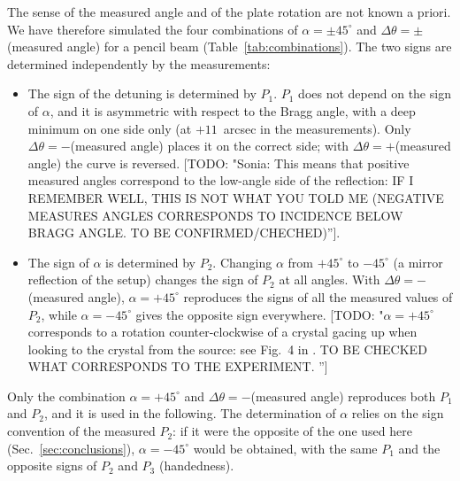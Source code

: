\documentclass{iucr}
\newcommand{\todo}[1]{{\color{red}[TODO: "#1'']}}
\begin{document}
The sense of the measured angle and of the plate rotation are not known a priori. We have therefore simulated the four combinations of $\alpha=\pm45^\circ$ and $\Delta\theta=\pm$(measured angle) for a pencil beam (Table~\ref{tab:combinations}). The two signs are determined independently by the measurements:
\begin{itemize}
\item The sign of the detuning is determined by $P_1$. $P_1$ does not depend on the sign of $\alpha$, and it is asymmetric with respect to the Bragg angle, with a deep minimum on one side only (at $+11$~arcsec in the measurements).
Only $\Delta\theta=-$(measured angle) places it on the correct side; with $\Delta\theta=+$(measured angle) the curve is reversed.
\todo{Sonia: This means that positive measured angles correspond to the low-angle side of the reflection: IF I REMEMBER WELL, THIS IS NOT WHAT YOU TOLD ME (NEGATIVE MEASURES ANGLES CORRESPONDS TO INCIDENCE BELOW BRAGG ANGLE. TO BE CONFIRMED/CHECHED)}.
\item The sign of $\alpha$ is determined by $P_2$. Changing $\alpha$ from $+45^\circ$ to $-45^\circ$ (a mirror reflection of the setup) changes the sign of $P_2$ at all angles. With $\Delta\theta=-$(measured angle), $\alpha=+45^\circ$ reproduces the signs of all the measured values of $P_2$, while $\alpha=-45^\circ$ gives the opposite sign everywhere. \todo{$\alpha=+45^\circ$ corresponds to a rotation counter-clockwise of a crystal gacing up when looking to the crystal from the source: see Fig.~4 in \cite{SanchezdelRio2026efields}. TO BE CHECKED WHAT CORRESPONDS TO THE EXPERIMENT. }
\end{itemize}
Only the combination $\alpha=+45^\circ$ and $\Delta\theta=-$(measured angle) reproduces both $P_1$ and $P_2$, and it is used in the following. The determination of $\alpha$ relies on the sign convention of the measured $P_2$: if it were the opposite of the one used here (Sec.~\ref{sec:conclusions}), $\alpha=-45^\circ$ would be obtained, with the same $P_1$ and the opposite signs of $P_2$ and $P_3$ (handedness). 
\end{document}
